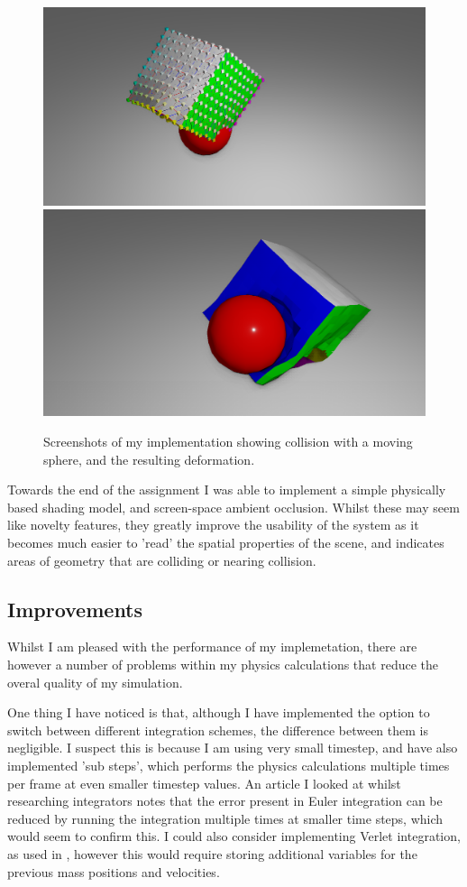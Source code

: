 \documentclass[]{acmsiggraph}
\begin{document}
\begin{figure}[htbp]
	\centering
	\includegraphics[width=0.9\linewidth]{images/screenshot001.png}
	\includegraphics[width=0.9\linewidth]{images/screenshot002.png}
	\caption{\label{fig:screenshots} Screenshots of my implementation showing collision with a moving sphere, and the resulting  deformation.}
\end{figure}

Towards the end of the assignment I was able to implement a simple physically based shading model, and screen-space ambient occlusion. Whilst these may seem like novelty features, they greatly improve the usability of the system as it becomes much easier to 'read' the spatial properties of the scene, and indicates areas of geometry that are colliding or nearing collision.

\subsection{Improvements}

Whilst I am pleased with the performance of my implemetation, there are however a number of problems within my physics calculations that reduce the overal quality of my simulation.

One thing I have noticed is that, although I have implemented the option to switch between different integration schemes, the difference between them is negligible. I suspect this is because I am using very small timestep, and have also implemented 'sub steps', which performs the physics calculations multiple times per frame at even smaller timestep values. An article \cite{integrators} I looked at whilst researching integrators notes that the error present in Euler integration can be reduced by running the integration multiple times at smaller time steps, which would seem to confirm this. I could also consider implementing Verlet integration, as used in \cite{massSpringGPU}, however this would require storing additional variables for the previous mass positions and velocities.
\end{document}
